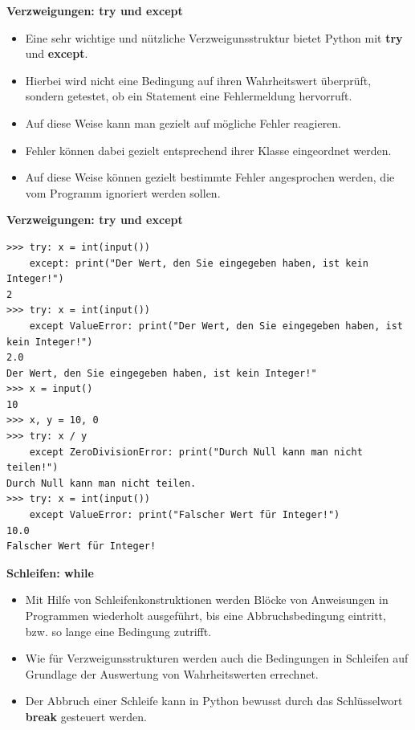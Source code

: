 \par\noindent\textbf{Verzweigungen: try und except}

\begin{itemize}
\itemsep1pt\parskip0pt
\item
  {Eine sehr wichtige und nützliche Verzweigunsstruktur bietet Python
  mit \textbf{try} und \textbf{except}.}
\item
  {Hierbei wird nicht eine Bedingung auf ihren Wahrheitswert überprüft,
  sondern getestet, ob ein Statement eine Fehlermeldung hervorruft.}
\item
  {Auf diese Weise kann man gezielt auf mögliche Fehler reagieren.}
\item
  {Fehler können dabei gezielt entsprechend ihrer Klasse eingeordnet
  werden.}
\item
  {Auf diese Weise können gezielt bestimmte Fehler angesprochen werden,
  die vom Programm ignoriert werden sollen.}
\end{itemize}



\par\noindent\textbf{Verzweigungen: try und except}

\begin{verbatim}
>>> try: x = int(input())
    except: print("Der Wert, den Sie eingegeben haben, ist kein Integer!")
2
>>> try: x = int(input())
    except ValueError: print("Der Wert, den Sie eingegeben haben, ist kein Integer!")
2.0
Der Wert, den Sie eingegeben haben, ist kein Integer!"
>>> x = input()
10
>>> x, y = 10, 0 
>>> try: x / y
    except ZeroDivisionError: print("Durch Null kann man nicht teilen!")
Durch Null kann man nicht teilen.
>>> try: x = int(input())
    except ValueError: print("Falscher Wert für Integer!")
10.0
Falscher Wert für Integer!
\end{verbatim}


\par\noindent\textbf{Schleifen: while}

\begin{itemize}
\itemsep1pt\parskip0pt
\item
  {Mit Hilfe von Schleifenkonstruktionen werden Blöcke von Anweisungen
  in Programmen wiederholt ausgeführt, bis eine Abbruchsbedingung
  eintritt, bzw. so lange eine Bedingung zutrifft.}
\item
  {Wie für Verzweigunsstrukturen werden auch die Bedingungen in
  Schleifen auf Grundlage der Auswertung von Wahrheitswerten errechnet.}
\item
  {Der Abbruch einer Schleife kann in Python bewusst durch das
  Schlüsselwort \textbf{break} gesteuert werden.}
\end{itemize}




